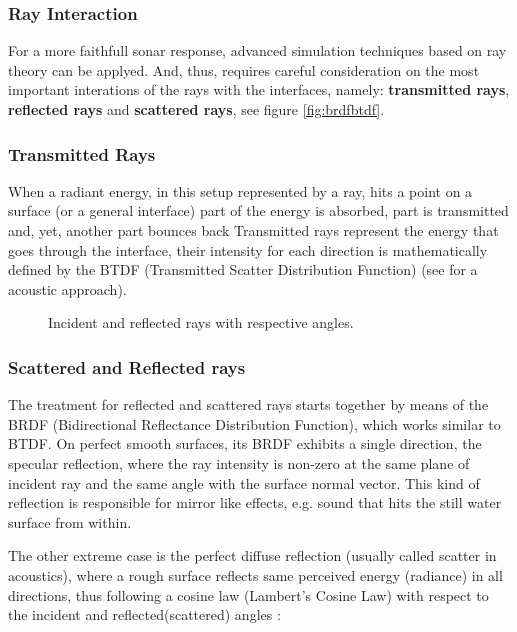\subsubsection{Ray Interaction}

For a more faithfull sonar response, advanced simulation techniques based on ray
theory can be applyed. And, thus, requires careful consideration on the most
important interations of the rays with the interfaces, namely:
\textbf{transmitted rays}, \textbf{reflected rays}  and \textbf{scattered rays},
see figure \ref{fig:brdfbtdf}.

\subsubsection{Transmitted Rays}
When a radiant energy, in this setup represented by a ray, hits a point on a
surface (or a general interface) part of the energy is absorbed, part is
transmitted and, yet, another part bounces back Transmitted rays represent the
energy that goes through the interface, their intensity for each direction is
mathematically defined by the BTDF (Transmitted Scatter Distribution
Function)\cite{bartell1981theory} (see \citet{rober2007ray} for a acoustic
approach).


\begin{figure}[h]
	\centering
	
	\caption{Incident and reflected rays with respective angles.}
	\label{fig:ray_reflect}
\end{figure}


\subsubsection{Scattered and Reflected rays}
\label{sss:rays}
The treatment for reflected and scattered rays starts together by means of the
BRDF (Bidirectional Reflectance Distribution
Function)\cite{blake1995remote,miller2015real,durany2015analytical}, which works
similar to BTDF. On perfect smooth surfaces, its BRDF exhibits a single
direction, the specular reflection, where the ray intensity is non-zero at the
same plane of incident ray and the same angle with the surface normal vector.
This kind of reflection is responsible for mirror like effects, e.g. sound that hits
the still water surface from within\cite{LURTON,Etter2013}.

The other extreme case is the perfect diffuse reflection (usually called scatter
in acoustics), where a rough surface reflects same perceived energy (radiance)
in all directions, thus following a cosine law (Lambert's Cosine Law) with
respect to the incident and reflected(scattered) angles
\cite{united1977geometrical,cox2004acoustic}:

